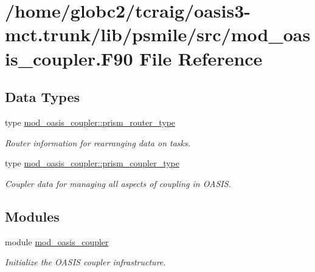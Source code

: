 \hypertarget{mod__oasis__coupler_8_f90}{}\section{/home/globc2/tcraig/oasis3-\/mct.trunk/lib/psmile/src/mod\+\_\+oasis\+\_\+coupler.F90 File Reference}
\label{mod__oasis__coupler_8_f90}
\subsection*{Data Types}
\begin{DoxyCompactItemize}
\item 
type \hyperlink{structmod__oasis__coupler_1_1prism__router__type}{mod\+\_\+oasis\+\_\+coupler\+::prism\+\_\+router\+\_\+type}
\begin{DoxyCompactList}\small\item\em Router information for rearranging data on tasks. \end{DoxyCompactList}\item 
type \hyperlink{structmod__oasis__coupler_1_1prism__coupler__type}{mod\+\_\+oasis\+\_\+coupler\+::prism\+\_\+coupler\+\_\+type}
\begin{DoxyCompactList}\small\item\em Coupler data for managing all aspects of coupling in O\+A\+S\+IS. \end{DoxyCompactList}\end{DoxyCompactItemize}
\subsection*{Modules}
\begin{DoxyCompactItemize}
\item 
module \hyperlink{namespacemod__oasis__coupler}{mod\+\_\+oasis\+\_\+coupler}
\begin{DoxyCompactList}\small\item\em Initialize the O\+A\+S\+IS coupler infrastructure. \end{DoxyCompactList}\end{DoxyCompactItemize}
